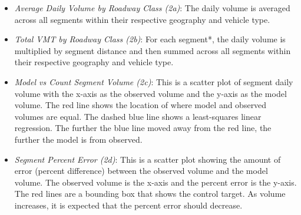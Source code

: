 \documentclass[
  letterpaper,
  DIV=11,
  numbers=noendperiod]{scrreprt}
\providecommand{\tightlist}{%
  \setlength{\itemsep}{0pt}\setlength{\parskip}{0pt}}\usepackage{longtable,booktabs,array}
\begin{document}
\begin{itemize}
\tightlist
\item
  \emph{Average Daily Volume by Roadway Class (2a)}: The daily volume is
  averaged across all segments within their respective geography and
  vehicle type.
\item
  \emph{Total VMT by Roadway Class (2b)}: For each segment*, the daily
  volume is multiplied by segment distance and then summed across all
  segments within their respective geography and vehicle type.
\item
  \emph{Model vs Count Segment Volume (2c)}: This is a scatter plot of
  segment daily volume with the x-axis as the observed volume and the
  y-axis as the model volume. The red line shows the location of where
  model and observed volumes are equal. The dashed blue line shows a
  least-squares linear regression. The further the blue line moved away
  from the red line, the further the model is from observed.
\item
  \emph{Segment Percent Error (2d)}: This is a scatter plot showing the
  amount of error (percent difference) between the observed volume and
  the model volume. The observed volume is the x-axis and the percent
  error is the y-axis. The red lines are a bounding box that shows the
  control target. As volume increases, it is expected that the percent
  error should decrease.
\end{itemize}
\end{document}
